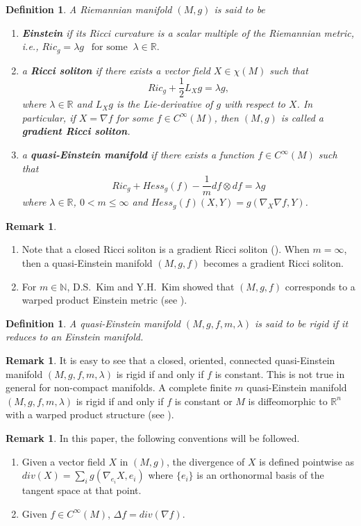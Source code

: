 \documentclass[12pt]{amsart}
\newtheorem{definition}[theorem]{Definition}
\theoremstyle{definition}
\newtheorem{remark}[theorem]{Remark}
\numberwithin{equation}{section}
\begin{document}
\begin{definition}
A Riemannian manifold $(M,g)$ is said to be
\begin{enumerate} 
\item \textbf{Einstein} if its Ricci curvature is a scalar multiple of the Riemannian metric, i.e., $Ric_{g} = \lambda g \ \ \text{ for some } \ \lambda \in \mathbb{R}.$
\item a \textbf{Ricci soliton} if there exists a vector field $X \in \chi(M)$ such that $$Ric_{g} + \frac{1}{2}L_{X}g = \lambda g,$$  where $\lambda \in \mathbb{R}$  and $L_{X}g$ is the Lie-derivative of $g$ with respect to $X$. In particular, if $X = \nabla f$ for some $f \in C^{\infty}(M)$, then $(M,g)$ is called a \textbf{gradient Ricci soliton}.
\item a \textbf{quasi-Einstein manifold} if there exists a function $f \in C^{\infty}(M)$ such that
$$Ric_{g} + Hess_{g}(f) - \frac{1}{m}df\otimes df = \lambda g$$
where  $\lambda \in \mathbb{R}$, $0 < m \leq \infty$ and $Hess_{g}(f)(X,Y) = g(\nabla_{X}\nabla f,Y)$.
\end{enumerate}
\end{definition}
\begin{remark}
\begin{enumerate}
    \item Note that a closed Ricci soliton is a gradient Ricci soliton (\cite{PRF}).  When $m = \infty$, then a quasi-Einstein manifold $(M,g,f)$ becomes a gradient Ricci soliton.
    \item For $m \in \mathbb{N}$, D.S.~Kim and Y.H.~Kim showed that $(M,g,f)$ corresponds to a warped product Einstein metric (see \cite{KKWP}).
\end{enumerate}
\end{remark}

\begin{definition}
A quasi-Einstein manifold $(M,g,f,m, \lambda)$ is said to be rigid if it reduces to an Einstein manifold. 
\end{definition}
\begin{remark}
It is easy to see that a closed, oriented, connected quasi-Einstein manifold $(M,g,f,m,\lambda)$ is rigid if and only if $f$ is constant. This is not true in general for non-compact manifolds. A complete finite $m$ quasi-Einstein manifold $(M,g,f,m,\lambda)$ is rigid if and only if $f$ is constant or $M$ is diffeomorphic to $\mathbb{R}^{n}$ with a warped product structure (see \cite{RQE}).
\end{remark}
\begin{remark}
    In this paper, the following conventions will be followed.
    \begin{enumerate}
        \item Given a vector field $X$ in $(M,g)$, the divergence of $X$  is defined pointwise as $div(X) = \sum_{i} g(\nabla _{e_{i}}X,e_{i})$ where $\{e_{i}\}$ is an orthonormal basis of the tangent space at that point.
        \item Given $f \in C^{\infty}(M)$, $\Delta f = div(\nabla f)$.
        \end{enumerate}
\end{remark}
\end{document}
